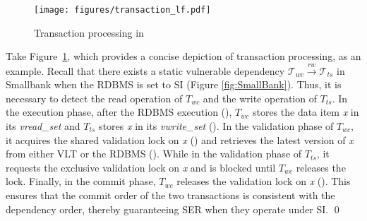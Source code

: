 \begin{figure}[t]
    \centering
    \texttt{[image: figures/transaction\_lf.pdf]}
    \vspace{-3mm}
    \caption{Transaction processing in \sysname}
    \label{fig:transaction_lifecycle}
    \vspace{-4mm}
\end{figure}

\begin{example}
    Take Figure~\ref{fig:transaction_lifecycle}, which provides a concise depiction of transaction processing, as an example. Recall that there exists a static vulnerable dependency $\mathcal{T}_{wc} \xrightarrow{rw} \mathcal{T}_{ts}$ in Smallbank when the RDBMS is set to SI (Figure \ref{fig:SmallBank}). Thus, it is necessary to detect the read operation of $T_{wc}$ and the write operation of $T_{ts}$. 
    In the execution phase, after the RDBMS execution (), $T_{wc}$ stores the data item \textit{x} in its \textit{vread\_set} and $T_{ts}$ stores \textit{x} in its \textit{vwrite\_set} (). 
    In the validation phase of $T_{wc}$, it acquires the shared validation lock on \textit{x} () and retrieves the latest version of \textit{x} from either VLT or the RDBMS (). 
    While in the validation phase of $T_{ts}$, it requests the exclusive validation lock on \textit{x} and is blocked until $T_{wc}$ releases the lock. 
    Finally, in the commit phase, $T_{wc}$ releases the validation lock on \textit{x} (). This ensures that the commit order of the two transactions is consistent with the dependency order, thereby guaranteeing SER when they operate under SI.
    \qed
\end{example}


